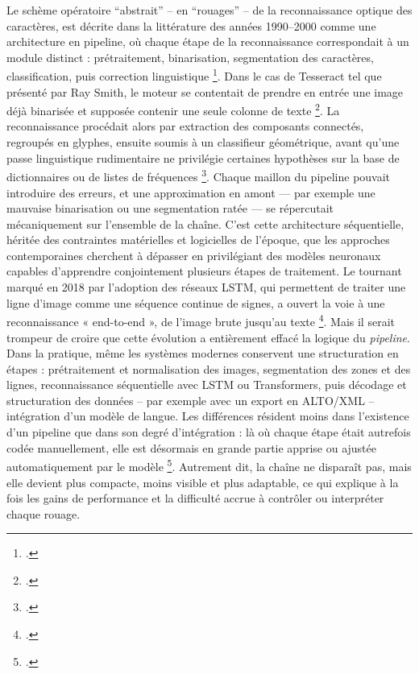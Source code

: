 Le schème opératoire \enquote{abstrait} -- en \enquote{rouages} -- de la reconnaissance optique des caractères, est décrite dans la littérature des années 1990–2000 comme une architecture en pipeline, où chaque étape de la reconnaissance correspondait à un module distinct : prétraitement, binarisation, segmentation des caractères, classification, puis correction linguistique \footcite[][]{lecolinet}. Dans le cas de Tesseract tel que présenté par Ray Smith, le moteur se contentait de prendre en entrée une image déjà binarisée et supposée contenir une seule colonne de texte \footcite[][]{smith}. La reconnaissance procédait alors par extraction des composants connectés, regroupés en glyphes, ensuite soumis à un classifieur géométrique, avant qu’une passe linguistique rudimentaire ne privilégie certaines hypothèses sur la base de dictionnaires ou de listes de fréquences \footcite[][]{smith2013}. Chaque maillon du pipeline pouvait introduire des erreurs, et une approximation en amont — par exemple une mauvaise binarisation ou une segmentation ratée — se répercutait mécaniquement sur l’ensemble de la chaîne. C’est cette architecture séquentielle, héritée des contraintes matérielles et logicielles de l’époque, que les approches contemporaines cherchent à dépasser en privilégiant des modèles neuronaux capables d’apprendre conjointement plusieurs étapes de traitement. Le tournant marqué en 2018 par l’adoption des réseaux LSTM, qui permettent de traiter une ligne d’image comme une séquence continue de signes, a ouvert la voie à une reconnaissance « end-to-end », de l’image brute jusqu’au texte \footcite[][]{smith}. Mais il serait trompeur de croire que cette évolution a entièrement effacé la logique du \emph{pipeline}. Dans la pratique, même les systèmes modernes conservent une structuration en étapes : prétraitement et normalisation des images, segmentation des zones et des lignes, reconnaissance séquentielle avec LSTM ou Transformers, puis décodage et structuration des données -- par exemple avec un export en ALTO/XML -- intégration d’un modèle de langue. Les différences résident moins dans l’existence d’un pipeline que dans son degré d’intégration : là où chaque étape était autrefois codée manuellement, elle est désormais en grande partie apprise ou ajustée automatiquement par le modèle \footcite[][]{pipeline-kraken}. Autrement dit, la chaîne ne disparaît pas, mais elle devient plus compacte, moins visible et plus adaptable, ce qui explique à la fois les gains de performance et la difficulté accrue à contrôler ou interpréter chaque rouage.

